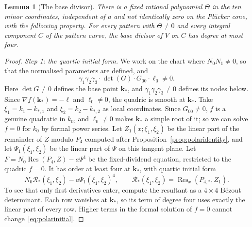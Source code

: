 \documentclass[11pt]{article}
\newtheorem{lemma}[theorem]{Lemma}
\theoremstyle{definition}
\theoremstyle{remark}
\begin{document}
\begin{lemma}[The base divisor]\label{lem:polarbase}
There is a fixed rational polynomial $\Theta$ in the ten minor coordinates,
independent of $a$ and not identically zero on the Pl\"ucker cone, with the
following property. For every pattern with $\Theta\ne0$ and every integral
component $C$ of the pattern curve, the base divisor of $V$ on
$C$ has degree at most four.
\end{lemma}
\begin{proof}
\emph{Step 1: the quartic initial form.} We work on the chart where $N_0N_1\ne0$, so that the normalised parameters are
defined, and
\[
 \gamma_1\gamma_2\gamma_3\cdot\det(G)\cdot G_{00}\cdot\ell_0\ne0.
\]
Here $\det G\ne0$ defines the base point $\mathbf k_*$, and
$\gamma_1\gamma_2\gamma_3\ne0$ defines its nodes below. Since
$\nabla f(\mathbf k_*)=-\ell$ and $\ell_0\ne0$, the quadric is smooth at
$\mathbf k_*$. Take $\xi_1=k_1-k_{*,1}$ and $\xi_2=k_2-k_{*,2}$ as local
coordinates. Since $G_{00}\ne0$, $f$ is a genuine quadratic in $k_0$, and
$\ell_0\ne0$ makes $\mathbf k_*$ a simple root of it; so we can solve $f=0$
for $k_0$ by formal power series.
Let $Z_1(x;\xi_1,\xi_2)$ be the linear part of the remainder of $Z$ modulo $P_4$
computed after Proposition~\ref{prop:polaridentity},
and let $\Psi_1(\xi_1,\xi_2)$ be the linear part of $\Psi$ on this tangent plane.
Let $F=N_0\operatorname{Res}(P_4,Z)-a\Psi^4$ be the fixed-dividend equation,
restricted to the quadric $f=0$. It has order at least four at $\mathbf k_*$, with
quartic initial form
\begin{equation}\label{eq:polarinitial}
 N_0\mathcal R_*(\xi_1,\xi_2)-a\Psi_1(\xi_1,\xi_2)^4,\qquad
 \mathcal R_*(\xi_1,\xi_2)=\operatorname{Res}_{x}(P_{4,*},Z_1).
\end{equation}
To see that only first derivatives enter, compute the resultant as a
$4\times4$ B\'ezout determinant. Each row vanishes at $\mathbf k_*$, so its term of
degree four uses exactly the linear part of every row. Higher terms in the
formal solution of $f=0$ cannot change~\eqref{eq:polarinitial}.


\end{proof}
\end{document}
